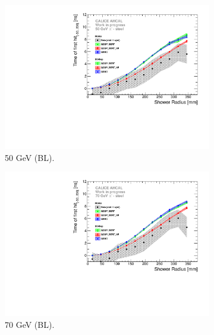 \begin{figure}[htbp!]
\begin{subfigure}[t]{0.5\textwidth}
		\includegraphics[width=1\textwidth]{../Thesis_Plots/Timing/Pions/Plots/ComparisonToSim/Time_Radius_50GeV_BL.pdf}
		\caption{50 GeV (BL).} \label{fig:Radius_BL_SimData_50GeV}
	\end{subfigure}
	\hfill
	\begin{subfigure}[t]{0.5\textwidth}
		\centering
		\includegraphics[width=1\textwidth]{../Thesis_Plots/Timing/Pions/Plots/ComparisonToSim/Time_Radius_70GeV_BL.pdf}
		\caption{70 GeV (BL).} \label{fig:Radius_BL_SimData_70GeV}
	\end{subfigure}
	\hfill
	\begin{subfigure}[t]{0.5\textwidth}
		\centering

\end{subfigure}
\end{figure}
